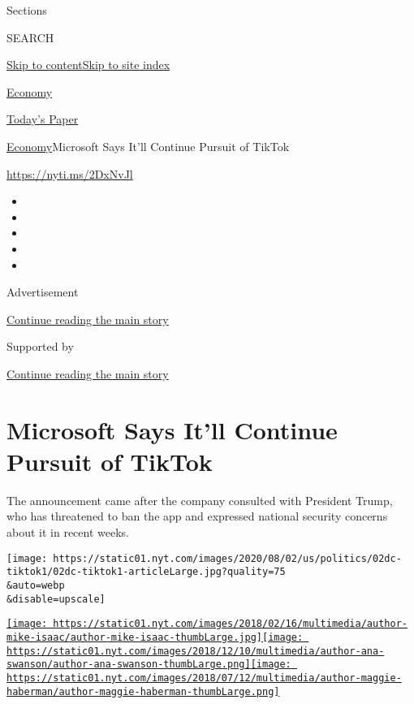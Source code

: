 Sections

SEARCH

\protect\hyperlink{site-content}{Skip to
content}\protect\hyperlink{site-index}{Skip to site index}

\href{https://www.nytimes.com/section/business/economy}{Economy}

\href{https://myaccount.nytimes.com/auth/login?response_type=cookie\&client_id=vi}{}

\href{https://www.nytimes.com/section/todayspaper}{Today's Paper}

\href{/section/business/economy}{Economy}\textbar{}Microsoft Says It'll
Continue Pursuit of TikTok

\url{https://nyti.ms/2DxNvJl}

\begin{itemize}
\item
\item
\item
\item
\item
\end{itemize}

Advertisement

\protect\hyperlink{after-top}{Continue reading the main story}

Supported by

\protect\hyperlink{after-sponsor}{Continue reading the main story}

\hypertarget{microsoft-says-itll-continue-pursuit-of-tiktok}{%
\section{Microsoft Says It'll Continue Pursuit of
TikTok}\label{microsoft-says-itll-continue-pursuit-of-tiktok}}

The announcement came after the company consulted with President Trump,
who has threatened to ban the app and expressed national security
concerns about it in recent weeks.

\texttt{[image: https://static01.nyt.com/images/2020/08/02/us/politics/02dc-tiktok1/02dc-tiktok1-articleLarge.jpg?quality=75\\\&auto=webp\\\&disable=upscale]}

\href{https://www.nytimes.com/by/mike-isaac}{\texttt{[image: https://static01.nyt.com/images/2018/02/16/multimedia/author-mike-isaac/author-mike-isaac-thumbLarge.jpg]}}\href{https://www.nytimes.com/by/ana-swanson}{\texttt{[image: https://static01.nyt.com/images/2018/12/10/multimedia/author-ana-swanson/author-ana-swanson-thumbLarge.png]}}\href{https://www.nytimes.com/by/maggie-haberman}{\texttt{[image: https://static01.nyt.com/images/2018/07/12/multimedia/author-maggie-haberman/author-maggie-haberman-thumbLarge.png]}}

